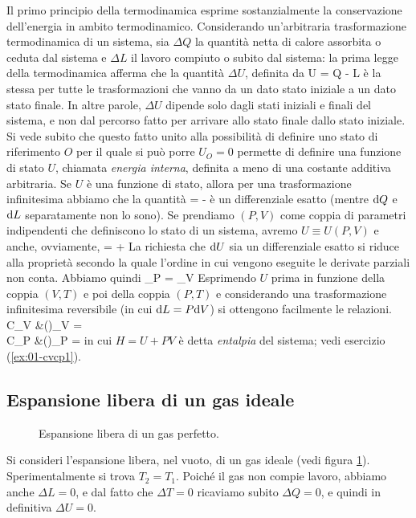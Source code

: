 Il primo principio della termodinamica esprime sostanzialmente la conservazione dell'energia in ambito termodinamico. Considerando un'arbitraria trasformazione termodinamica di un sistema, sia $\Delta Q$ la quantità netta di calore assorbita o ceduta dal sistema e $\Delta L$ il lavoro compiuto o subito dal sistema: la prima legge della termodinamica afferma che la quantità $\Delta U$, definita da
\be
\label{eq:01-DeltaU}
\Delta U = \Delta Q - \Delta L
\ee
è la stessa per tutte le trasformazioni che vanno da un dato stato iniziale a un dato stato finale. In altre parole, $\Delta U$ dipende solo dagli stati iniziali e finali del sistema, e non dal percorso fatto per arrivare allo stato finale dallo stato iniziale. Si vede subito che questo fatto unito alla possibilità di definire uno stato di riferimento $O$ per il quale si può porre $U_{O} = 0$ permette di definire una {funzione di stato} $U$, chiamata {\em energia interna}, definita a meno di una costante additiva arbitraria. Se $U$ è una funzione di stato, allora per una trasformazione infinitesima abbiamo che la quantità
\be
\label{eq:01-dU}
 =  - 
\ee
è un differenziale esatto (mentre ${\textrm d}Q$ e ${\textrm d}L$ separatamente non lo sono). Se prendiamo $(P,V)$ come coppia di parametri indipendenti che definiscono lo stato di un sistema, avremo $U\equiv U(P,V)$ e anche, ovviamente,
\be
\label{eq:01-dU-PV}
 =  + 
\ee
La richiesta che ${\textrm d}U$ sia un differenziale esatto si riduce alla proprietà secondo la quale l'ordine in cui vengono eseguite le derivate parziali non conta. Abbiamo quindi
\be
\label{eq:01-dU-PV-esatto}
_{P} = _{V}
\ee
Esprimendo $U$ prima in funzione della coppia $(V,T)$ e poi della coppia $(P,T)$ e considerando una trasformazione infinitesima reversibile (in cui ${\textrm d}L = P{\textrm d}V$) si ottengono facilmente le relazioni.
\bea
\label{eq:01-cvcp}
C_{V} &\equiv \left(\right)_{V} = \nonumber\\
C_{P} &\equiv \left(\right)_{P} =  
\eea
in cui $H = U + PV$ è detta {\em entalpia} del sistema; vedi esercizio (\ref{ex:01-cvcp1}).

\subsection{Espansione libera di un gas ideale}
\begin{figure}[!ht]
  \centering
  
  \caption{Espansione libera di un gas perfetto.}
  \label{fig:01-espansione}
\end{figure}
Si consideri l'espansione libera, nel vuoto, di un gas ideale (vedi figura \ref{fig:01-espansione}). Sperimentalmente si trova $T_{2} = T_{1}$. Poiché il gas non compie lavoro, abbiamo anche $\Delta L = 0$, e dal fatto che $\Delta T = 0$ ricaviamo subito $\Delta Q = 0$, e quindi in definitiva $\Delta U = 0$.

